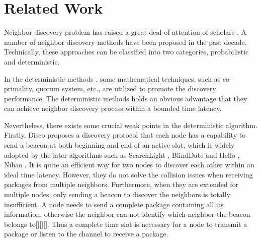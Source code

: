 \section{Related Work}
\label{RW}







Neighbor discovery problem has raised a great deal of attention of scholars \cite{sun2014energy}. 
A number of neighbor discovery methods have been proposed in the past decade.
Technically, these approaches can be classified into two categories, probabilistic and deterministic. 

In the deterministic methods \cite{dutta2008practical,kandhalu2010u,
bakht2012searchlight,sun2014hello,chen2015heterogeneous,
wang2015blinddate,qiu2016talk}, some mathematical techniques, such as
co-primality, quorum system, etc., are utilized to promote the discovery performance.
The deterministic methods holds an obvious advantage that they
can achieve neighbor discovery process within a bounded time latency.

Nevertheless, there exists some crucial weak points in the deterministic algorithm.
Firstly, Disco \cite{dutta2008practical} proposes a discovery protocol that
each node has a capability to send a beacon at both beginning and end of
an active slot, which is widely adopted by the later algorithms such as
SearchLight \cite{bakht2012searchlight}, BlindDate \cite{wang2015blinddate}
and Hello \cite{sun2014hello}, Nihao \cite{qiu2016talk}. It is quite an efficient way for two nodes to discover
each other within an ideal time latency. However,  they do not solve the collision 
issues when receiving packages from multiple neighbors. Furthermore, when they are 
extended for multiple nodes, only sending a beacon to discover the neighbors is 
totally insufficient. A node needs to send a complete package containing all its information,
otherwise the neighbor can not  identify which neighbor the beacon belongs to[][][].
Thus a complete time slot is necessary for a node to transmit a package or listen to 
the channel to receive a package.

